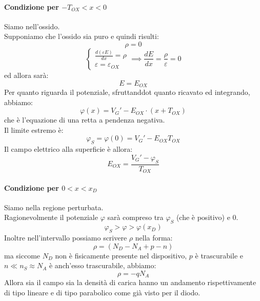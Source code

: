 \documentclass[../main.tex]{subfiles}
\begin{document}
	\paragraph{Condizione per $-T_{OX} < x < 0$}
	Siamo nell'ossido.\\
	Supponiamo che l'ossido sia puro e quindi risulti:
	$$\rho = 0$$
	$$\begin{cases} \frac{d(\varepsilon E)}{dx} = \rho \\ \varepsilon = \varepsilon_{OX} \end{cases} \implies \frac{dE}{dx} = \frac{\rho}{\varepsilon} = 0$$
	ed allora sarà:
	$$E = E_{OX}$$
	Per quanto riguarda il potenziale, sfruttanddot quanto ricavato ed integrando, abbiamo:
	$$\varphi(x) = V_G' - E_{OX} \cdot (x + T_{OX})$$
	che è l'equazione di una retta a pendenza negativa.\\
	Il limite estremo è:
	$$\varphi_S = \varphi(0) = V_G' - E_{OX}T_{OX}$$
	Il campo elettrico alla superficie è allora:
	$$E_{OX} = \frac{V_G' - \varphi_S}{T_{OX}}$$
	\paragraph{Condizione per $0 < x < x_D$}
	Siamo nella regione perturbata.\\
	Ragionevolmente il potenziale $\varphi$ sarà compreso tra $\varphi_S$ (che è positivo) e $0$.
	$$\varphi_S > \varphi > \varphi(x_D)$$
	Inoltre nell'intervallo possiamo scrivere $\rho$ nella forma:
	$$\rho = (N_D - N_A + p - n)$$
	ma siccome $N_D$ non è fisicamente presente nel dispositivo, $p$ è trascurabile e $n \ll n_S \approx N_A$ è anch'esso trascurabile, abbiamo:
	$$\rho = -qN_A$$
	Allora sia il campo sia la densità di carica hanno un andamento rispettivamente di tipo lineare e di tipo parabolico come già visto per il diodo.
\end{document}
